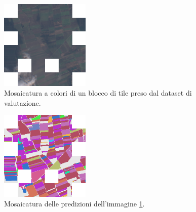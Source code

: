 \begin{multicols}{2}
{
    \begin{figure}[H]
        \centering
        \includegraphics[width=0.38\textwidth]{Immagini/sperimentazione/MOSAICATURA_2_RGB.png}
        \caption{Mosaicatura a colori di un blocco di tile preso dal dataset 
        di valutazione.}
        \label{fig:MOSAIC_RGB_2}
    \end{figure}
}
{
    \begin{figure}[H]
        \centering
        \includegraphics[width=0.38\textwidth]{Immagini/sperimentazione/MOSAICATURA_2_MASK.png}
        \caption{Mosaicatura delle predizioni dell'immagine \ref{fig:MOSAIC_RGB_2}.}
    \end{figure}
}
\end{multicols}
\newpage
